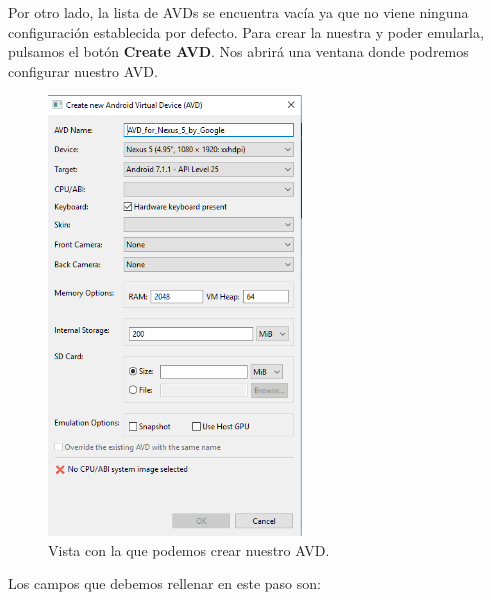 Por otro lado, la lista de \glspl{AVD} se encuentra vacía ya que no viene ninguna configuración establecida por defecto. Para crear la nuestra y poder emularla, pulsamos el botón \textbf{Create AVD}. Nos abrirá una ventana donde podremos configurar nuestro \gls{AVD}.

\begin{figure}[H]
\centering
  \includegraphics[width=0.6\textwidth]{Figures/anexo/android_tools/avd_manager_avds_create}
  \caption{Vista con la que podemos crear nuestro \gls{AVD}.}
\end{figure}

Los campos que debemos rellenar en este paso son:


